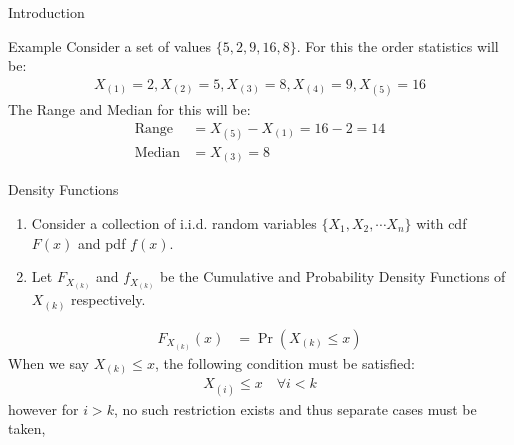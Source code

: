\documentclass{beamer}
\providecommand{\pr}[1]{\ensuremath{\Pr\left(#1\right)}}
\begin{document}
\begin{frame}{Introduction}
\begin{block}{Example}
        Consider a set of values $\{5,2,9,16,8\}$. For this the order statistics will be:
        \begin{align}
            X_{(1)} = 2, X_{(2)} = 5,
            X_{(3)} = 8,
            X_{(4)} = 9,
            X_{(5)} = 16
        \end{align}
        The Range and Median for this will be:
        \begin{align}
            \text{Range}&=X_{(5)}-X_{(1)}= 16-2=14\\
            \text{Median}&= X_{(3)}= 8
        \end{align}
        \end{block}
\end{frame}

\begin{frame}{Density Functions}
\begin{enumerate}[]
    \item Consider a collection of i.i.d. random variables $\{X_1, X_2, \cdots X_n\}$ with cdf $F(x)$ and pdf $f(x)$.
    \item Let $F_{X_{(k)}}$ and $f_{X_{(k)}}$ be the Cumulative and Probability Density Functions of $X_{(k)}$ respectively.
\end{enumerate}
    \begin{align}
        F_{X_{(k)}}(x) &= \pr{X_{(k)}\leq x}\label{eq_cdf_pr}
    \end{align}
    When we say $X_{(k)}\leq x$, the following condition must be satisfied:
    \begin{align}
        X_{(i)}\leq x\quad \forall i<k
    \end{align}
    however for $i>k$, no such restriction exists and thus separate cases must be taken,
    
    
\end{frame}
\end{document}
